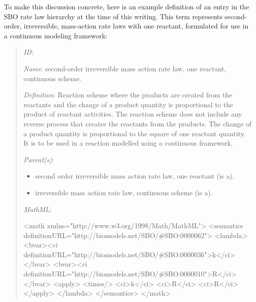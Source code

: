 To make this discussion concrete, here is an example definition of
an entry in the SBO rate law hierarchy at the time of this
writing.  This term represents second-order, irreversible,
mass-action rate laws with one reactant, formulated for use in a
continuous modeling framework:
\begin{quote}
\begin{description}

\item \emph{ID}: 

\item \emph{Name}: second-order irreversible mass action rate law,
  one reactant, continuous scheme.

\item \emph{Definition}: Reaction scheme where the products are
  created from the reactants and the change of a product quantity
  is proportional to the product of reactant activities. The
  reaction scheme does not include any reverse process that
  creates the reactants from the products. The change of a product
  quantity is proportional to the square of one reactant quantity.
  It is to be used in a reaction modelled using a continuous
  framework.

\item \emph{Parent(s)}: 
  \begin{itemize}
  \item {} second order irreversible mass action
    rate law, one reactant (is a).
  \item {}
    irreversible mass action rate law, continuous scheme (is a).
  \end{itemize}
  
\item \emph{MathML}:
\begin{example}
<math xmlns="http://www.w3.org/1998/Math/MathML">
   <semantics definitionURL="http://biomodels.net/SBO/#SBO:0000062">
      <lambda>
         <bvar><ci definitionURL="http://biomodels.net/SBO/#SBO:0000036">k</ci></bvar>
         <bvar><ci definitionURL="http://biomodels.net/SBO/#SBO:0000010">R</ci></bvar>
         <apply>
            <times/>
            <ci>k</ci>
            <ci>R</ci>
            <ci>R</ci>
         </apply>
      </lambda>
   </semantics>
</math>
\end{example}

\end{description}
\end{quote}
